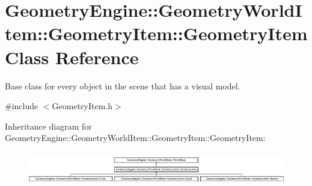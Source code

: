 \hypertarget{class_geometry_engine_1_1_geometry_world_item_1_1_geometry_item_1_1_geometry_item}{}\section{Geometry\+Engine\+::Geometry\+World\+Item\+::Geometry\+Item\+::Geometry\+Item Class Reference}
\label{class_geometry_engine_1_1_geometry_world_item_1_1_geometry_item_1_1_geometry_item}


Base class for every object in the scene that has a visual model.  




{\ttfamily \#include $<$Geometry\+Item.\+h$>$}

Inheritance diagram for Geometry\+Engine\+::Geometry\+World\+Item\+::Geometry\+Item\+::Geometry\+Item\+:\begin{figure}[H]
\begin{center}
\leavevmode
\includegraphics[height=1.428571cm]{class_geometry_engine_1_1_geometry_world_item_1_1_geometry_item_1_1_geometry_item}
\end{center}
\end{figure}
